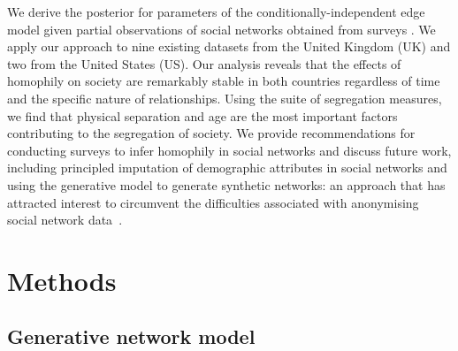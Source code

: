 \documentclass{scrartcl}
\newcommand{\seeds}{U}
\newcommand{\nominees}{V}
\newcommand{\missing}{R}
\newcommand{\titlecaption}[2]{\caption[#1]{\emph{#1} #2}}
\begin{document}
We derive the posterior for parameters of the conditionally-independent edge model given partial observations of social networks obtained from surveys%
. We apply our approach to nine existing datasets from the United Kingdom (UK) and two from the United States (US). Our analysis reveals that the effects of homophily on society are remarkably stable in both countries regardless of time and the specific nature of relationships. Using the suite of segregation measures, we find that physical separation and age are the most important factors contributing to the segregation of society. We provide recommendations for conducting surveys to infer homophily in social networks and discuss future work, including principled imputation of demographic attributes in social networks and using the generative model to generate synthetic networks: an approach that has attracted interest to circumvent the difficulties associated with anonymising social network data~\cite{Pfeiffer-III2014, Lieberman2010, Lieberman2012, Nettleton2016, Sathanur2017}.

\section{Methods}

\subsection{Generative network model\label{sec:model}}

\end{document}

